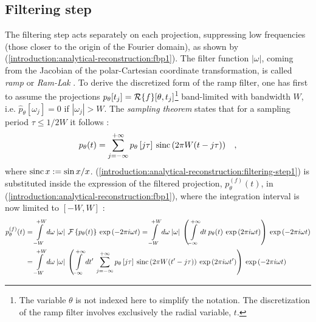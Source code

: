 {\subsection{Filtering step}
\label{intruduction:analytical-reconstruction:filtering-step}
The filtering step acts separately on each projection, suppressing low frequencies (those closer to the origin of the
Fourier domain), as shown by (\ref{introduction:analytical-reconstruction:fbp1}). The filter function $|\omega|$, coming
from the Jacobian of the polar-Cartesian coordinate transformation, is called \emph{ramp} or \emph{Ram-Lak} \cite{Kak2001}.
\newline
To derive the discretized form of the ramp filter, one has first to assume the projections 
$p_{\theta}[t_{j}] = \operatorname{\mathcal{R}}\{f\}[\theta,t_{j}]$\footnote{The variable $\theta$ is not indexed here 
to simplify the notation. The discretization of the ramp filter involves exclusively the radial variable, $t$.}
 band-limited with bandwidth $W$,
i.e. $\hat{p}_{\theta}[\omega_{j}] = 0$ if $|\omega_{j}| > W$. 
The \emph{sampling theorem} \cite{Whittaker1935} states that for a sampling period $\tau \leq 1/2W$ it follows \cite{Murrell1996}:
\begin{equation}
  p_{\theta}(t) = \sum\limits_{j=-\infty}^{+\infty} p_{\theta}\left[j\tau\right] \: \operatorname{sinc}\left( 2\pi W(t - j\tau)\right)\hspace{0.3cm},
  \label{introduction:analytical-reconstruction:filtering-step1}
\end{equation}
where $\operatorname{sinc} x := \sin x/x$.
(\ref{introduction:analytical-reconstruction:filtering-step1}) is substituted inside the expression of the filtered projection, $p_{\theta}^{(f)}(t)$, in
(\ref{introduction:analytical-reconstruction:fbp1}), where the integration interval is now limited to $[-W,W]$ \cite{Murrell1996}:
\begin{align}
\allowdisplaybreaks[2]
  p_{\theta}^{(f)}(t) &= \int\limits_{-W}^{+W} d\omega\:|\omega| \: \Four\left\{ p_{\theta}(t) \right\}\:\exp\left(-2\pi i\omega t\right) 
	              = \int\limits_{-W}^{+W} d\omega\:|\omega| \: \left( \int\limits_{-\infty}^{+\infty} dt \: p_{\theta}(t) \: \exp\left(2\pi i\omega t\right) \right) \:\exp\left(-2\pi i\omega t\right) \nonumber\\
	              &= \int\limits_{-W}^{+W} d\omega\:|\omega| \: \left( \int\limits_{-\infty}^{+\infty} dt' \: 
	                        \sum\limits_{j=-\infty}^{+\infty} p_{\theta}\left[j\tau\right] \: \sinc\left( 2\pi W(t' - j\tau)\right)
	                        \: \exp\left(2\pi i\omega t'\right) \right) \:\exp\left(-2\pi i\omega t\right) \nonumber\\ 

\end{align}}
